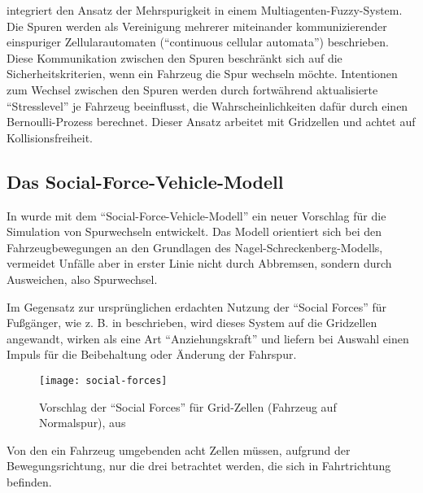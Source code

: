 \cite{multi-fuzzy} integriert den Ansatz der Mehrspurigkeit in einem Multiagenten-Fuzzy-System. 
Die Spuren werden als Vereinigung mehrerer miteinander kommunizierender einspuriger Zellularautomaten (\enquote{continuous cellular automata}) beschrieben. 
Diese Kommunikation zwischen den Spuren beschränkt sich auf die Sicherheitskriterien, wenn ein Fahrzeug die Spur wechseln möchte. 
Intentionen zum Wechsel zwischen den Spuren werden durch fortwährend aktualisierte \enquote{Stresslevel} je Fahrzeug beeinflusst, die Wahrscheinlichkeiten dafür durch einen Bernoulli-Prozess berechnet.
Dieser Ansatz arbeitet mit Gridzellen und achtet auf Kollisionsfreiheit.



\subsection{Das Social-Force-Vehicle-Modell}
\label{sec:social-force-vm}

In \cite{dat-ba} wurde mit dem \enquote{Social-Force-Vehicle-Modell} ein neuer Vorschlag für die Simulation von Spurwechseln entwickelt. 
Das Modell orientiert sich bei den Fahrzeugbewegungen an den Grundlagen des Nagel-Schreckenberg-Modells, vermeidet Unfälle aber in erster Linie nicht durch Abbremsen, sondern durch Ausweichen, also Spurwechsel. 

Im Gegensatz zur ursprünglichen erdachten Nutzung der \enquote{Social Forces} für Fußgänger, wie z. B. in \cite{soc-for} beschrieben, wird dieses System auf die Gridzellen angewandt, wirken als eine Art \enquote{Anziehungskraft} und liefern bei Auswahl einen Impuls für die Beibehaltung oder Änderung der Fahrspur. 
\begin{figure}[hptb]
 \centering
 \texttt{[image: social-forces]}
 \caption[\enquote{Social Forces} für Grid-Zellen]{Vorschlag der \enquote{Social Forces} für Grid-Zellen (Fahrzeug auf Normalspur), aus \cite{dat-ba}}
 \label{figure:social-forces}
\end{figure}
\noindent
Von den ein Fahrzeug umgebenden acht Zellen müssen, aufgrund der Bewegungsrichtung, nur die drei betrachtet werden, die sich in Fahrtrichtung befinden.

